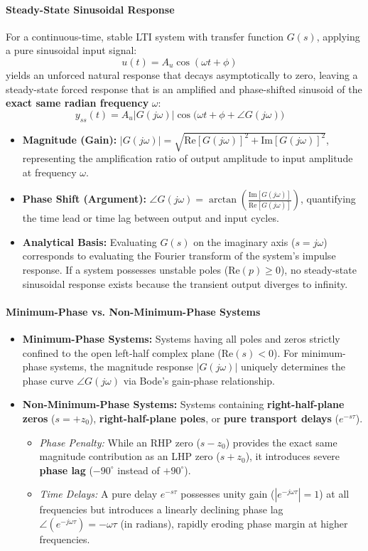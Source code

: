 \documentclass[12pt,onecolumn,twoside ]{article}
\begin{document}
	\paragraph{Steady-State Sinusoidal Response}
	For a continuous-time, stable LTI system with transfer function $G(s)$, applying a pure sinusoidal input signal: \[
	u(t) = A_u \cos(\omega t + \phi) \quad
	\] yields an unforced natural response that decays asymptotically to zero, leaving a steady-state forced response that is an amplified and phase-shifted sinusoid of the \textbf{exact same radian frequency} $\omega$: \[
	y_{ss}(t) = A_u |G(j\omega)| \cos\big(\omega t + \phi + \angle G(j\omega)\big) \quad
	\]
	\begin{itemize}
		\item
		\textbf{Magnitude (Gain):} $|G(j\omega)| = \sqrt{\text{Re}[G(j\omega)]^2 + \text{Im}[G(j\omega)]^2}$, representing the amplification ratio of output amplitude to input amplitude at frequency $\omega$.
		\item
		\textbf{Phase Shift (Argument):} $\angle G(j\omega) = \arctan\left(\frac{\text{Im}[G(j\omega)]}{\text{Re}[G(j\omega)]}\right)$, quantifying the time lead or time lag between output and input cycles.
		\item
		\textbf{Analytical Basis:} Evaluating $G(s)$ on the imaginary axis ($s = j\omega$) corresponds to evaluating the Fourier transform of the system's impulse response. If a system possesses unstable poles ($\text{Re}(p) \ge 0$), no steady-state sinusoidal response exists because the transient output diverges to infinity.
	\end{itemize}
	\paragraph{Minimum-Phase vs. Non-Minimum-Phase Systems}
	\begin{itemize}
		\item
		\textbf{Minimum-Phase Systems:} Systems having all poles and zeros strictly confined to the open left-half complex plane ($\text{Re}(s) < 0$). For minimum-phase systems, the magnitude response $|G(j\omega)|$ uniquely determines the phase curve $\angle G(j\omega)$ via Bode's gain-phase relationship.
		\item
		\textbf{Non-Minimum-Phase Systems:} Systems containing \textbf{right-half-plane zeros} ($s = +z_0$), \textbf{right-half-plane poles}, or \textbf{pure transport delays} ($e^{-s\tau}$).
		\begin{itemize}
			\item
			\textit{Phase Penalty:} While an RHP zero ($s - z_0$) provides the exact same magnitude contribution as an LHP zero ($s + z_0$), it introduces severe \textbf{phase lag} ($-90^\circ$ instead of $+90^\circ$).
			\item
			\textit{Time Delays:} A pure delay $e^{-s\tau}$ possesses unity gain ($|e^{-j\omega\tau}| = 1$) at all frequencies but introduces a linearly declining phase lag $\angle(e^{-j\omega\tau}) = -\omega \tau$ (in radians), rapidly eroding phase margin at higher frequencies.
		\end{itemize}
	\end{itemize}
	
\end{document}
